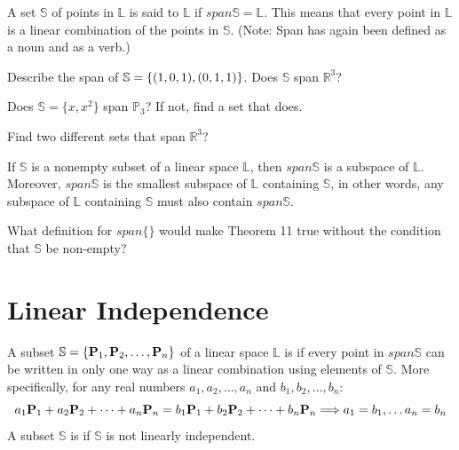 \begin{defn}
	A set $\mathbb{S}$ of points in $\mathbb{L}$ is said to  $\mathbb{L}$ if $span\mathbb{S}=\mathbb{L}$. This means that every point in $\mathbb{L}$ is a linear combination of the points in $\mathbb{S}$. (Note: Span has again been defined as a noun and as a verb.)
\end{defn}

\begin{myexa}[\bd{a}]
	 Describe the span of $\mathbb{S} = \{ ({1},{0},{1}),({0},{1},{1})\}$. Does $\mathbb{S}$ span $\mathbb{R}^3$?
\end{myexa}

\begin{myexb}[\bd{b}]
	 Does $\mathbb{S} = \{ x,x^2\}$ span $\mathbb{P}_3$?  If not, find a set that does. 
\end{myexb}

\begin{myexc}[\bd{c}]
	Find two different sets that span $\mathbb{R}^3$?
\end{myexc}

\begin{theorem}
	If  $\mathbb{S}$ is a nonempty subset of a linear space $\mathbb{L}$, then $span\mathbb{S}$ is a subspace of $\mathbb{L}$.  Moreover, $span\mathbb{S}$ is the smallest subspace of $\mathbb{L}$ containing $\mathbb{S}$, in other words, any subspace of $\mathbb{L}$ containing $\mathbb{S}$ must also contain $span\mathbb{S}$.
\end{theorem}
\vspace{-.3in}\hspace{5in}\begin{annotation}
\end{annotation}


\noindent {} What definition for $span\{\}$ would make Theorem 11 true without the condition that $\mathbb{S}$ be non-empty?

\section{Linear Independence}    \label{Linear Independence}

\begin{defn}
	 A subset $\mathbb{S} = \{ \textbf{P}_1,\textbf{P}_2,\ldots,\textbf{P}_n\}$  of a linear space $\mathbb{L}$ is  if every point  in $span\mathbb{S}$ can be written in only one way as a linear combination using elements of $\mathbb{S}$. More specifically, for any real numbers $a_1,a_2,\ldots,a_n$  and $b_1,b_2,\ldots,b_n$: 
	 	\[ a_1\textbf{P}_1 + a_2\textbf{P}_2 +\cdots+a_n\textbf{P}_n = b_1\textbf{P}_1 + b_2\textbf{P}_2 +\cdots+ b_n\textbf{P}_n  \Longrightarrow a_1=b_1,\ldots a_n=b_n \]
	 A subset $\mathbb{S}$ is   if $\mathbb{S}$ is not linearly independent. 
\end{defn}
   
